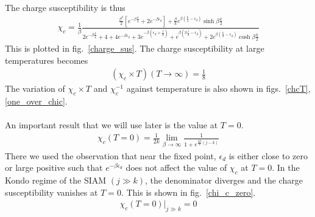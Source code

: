 \documentclass[twoside]{report}
\numberwithin{equation}{section}
\begin{document}
The charge susceptibility is thus
\begin{equation}\begin{aligned}
	\chi_c = \frac{1}{\beta}\frac{\frac{\beta^2}{2}\left[e^{-\beta \frac{k}{4}} + 2e^{-\beta \epsilon_d}\right] + \frac{\beta}{k}e^{\beta\left(\frac{k}{4} - \epsilon_d\right)}\sinh \beta\frac{k}{2}}{2e^{-\beta \frac{k}{4}} + 4 + 4e^{-\beta \epsilon_d} + 3e^{-\beta\left( \epsilon_d + \frac{j}{4} \right) } + e^{\beta\left( 3\frac{j}{4} - \epsilon_d \right)} + 2e^{\beta \left(\frac{k}{4} - \epsilon_d\right)}\cosh \beta \frac{k}{2}}
\end{aligned}\end{equation}
This is plotted in fig.~\ref{charge_sus}. The charge susceptibility at large temperatures becomes
\begin{equation}\begin{aligned}
	\left(\chi_c\times T\right) (T \to \infty) = \frac{1}{8}
\end{aligned}\end{equation}
The variation of \(\chi_c \times T\) and \(\chi_c^{-1}\) against temperature is also shown in figs.~\ref{chcT},\ref{one_over_chic}.
\\\\An important result that we will use later is the value at \(T=0\).
\begin{equation}\begin{aligned}
	\chi_c(T=0) =  \frac{1}{2k}\lim_{\beta \to \infty} \frac{1}{1 + e^{\frac{3\beta}{4} \left(j-k\right) }}
\end{aligned}\end{equation}
There we used the observation that near the fixed point, \(\epsilon_d\) is either close to zero or large positive such that \(e^{-\beta \epsilon_d}\) does not affect the value of \(\chi_c\) at \(T=0\). In the Kondo regime of the SIAM \((j \gg k)\), the denominator diverges and the charge susceptibility vanishes at \(T=0\). This is shown in fig.~\ref{chi_c_zero}.
\begin{equation}\begin{aligned}
	\chi_c(T=0)\bigg\vert_{j \gg k} = 0
\end{aligned}\end{equation}
\end{document}
